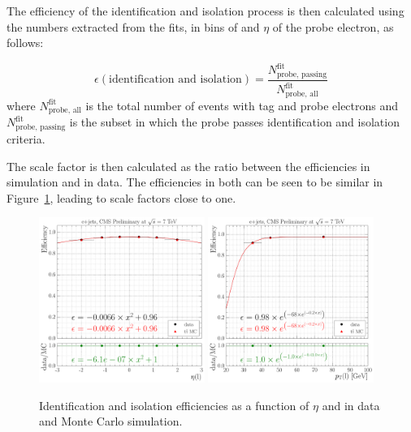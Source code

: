 The efficiency of the identification and isolation process is then calculated using the numbers extracted
from the fits, in bins of \pt and $\eta$ of the probe electron, as follows:

\begin{equation}
\epsilon(\text{identification and isolation}) = \frac{N^{\text{fit}}_{\text{probe, passing}}}{N^{\text{fit}}_{\text{probe, all}}}
\end{equation}
where $N^{\text{fit}}_{\text{probe, all}}$ is the total number of events with tag and probe electrons and
$N^{\text{fit}}_{\text{probe, passing}}$ is the subset in which the probe passes identification and isolation
criteria.

The scale factor is then calculated as the ratio between the efficiencies in simulation and in data. The
efficiencies in both can be seen to be similar in Figure~\ref{fig:electron_id_iso_efficiencies_wrt_eta_pt},
leading to scale factors close to one.

\begin{figure}[hbtp]
    \centering
      \includegraphics[width=0.48\textwidth]{Chapters/04_Analysis/04b_XSections/images/lepton_scale_factors/CBConvolution/electron/efficiency_eta_id_iso}\hfill
      \includegraphics[width=0.48\textwidth]{Chapters/04_Analysis/04b_XSections/images/lepton_scale_factors/CBConvolution/electron/efficiency_pt_id_iso}
      \caption[Identification and isolation efficiencies as a function of $\eta$ and \pt in data and \ttbar
      Monte Carlo simulation.]{Identification and isolation efficiencies as a function of $\eta$ and \pt in data and \ttbar
      Monte Carlo simulation.}
     \label{fig:electron_id_iso_efficiencies_wrt_eta_pt}
\end{figure}

